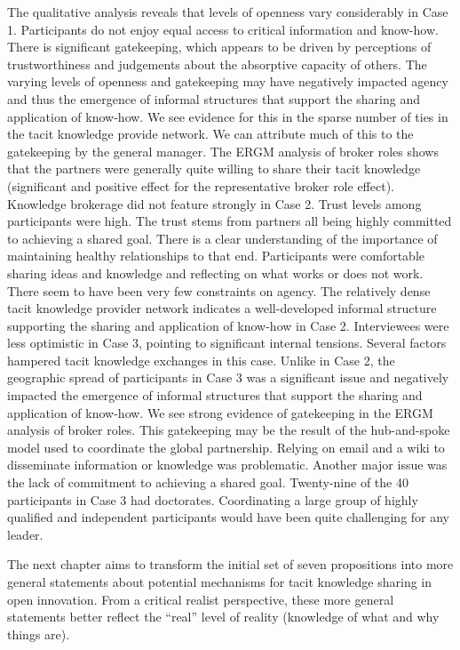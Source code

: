 The qualitative analysis reveals that levels of openness vary considerably in Case 1. Participants do not enjoy equal access to critical information and know-how. There is significant gatekeeping, which appears to be driven by perceptions of trustworthiness and judgements about the absorptive capacity of others. The varying levels of openness and gatekeeping may have negatively impacted agency and thus the emergence of informal structures that support the sharing and application of know-how. We see evidence for this in the sparse number of ties in the tacit knowledge provide network. We can attribute much of this to the gatekeeping by the general manager. The ERGM analysis of broker roles shows that the partners were generally quite willing to share their tacit knowledge (significant and positive effect for the representative broker role effect). Knowledge brokerage did not feature strongly in Case 2. Trust levels among participants were high. The trust stems from partners all being highly committed to achieving a shared goal. There is a clear understanding of the importance of maintaining healthy relationships to that end. Participants were comfortable sharing ideas and knowledge and reflecting on what works or does not work. There seem to have been very few constraints on agency. The relatively dense tacit knowledge provider network indicates a well-developed informal structure supporting the sharing and application of know-how in Case 2. Interviewees were less optimistic in Case 3, pointing to significant internal tensions. Several factors hampered tacit knowledge exchanges in this case. Unlike in Case 2, the geographic spread of participants in Case 3 was a significant issue and negatively impacted the emergence of informal structures that support the sharing and application of know-how. We see strong evidence of gatekeeping in the ERGM analysis of broker roles. This gatekeeping may be the result of the hub-and-spoke model used to coordinate the global partnership. Relying on email and a wiki to disseminate information or knowledge was problematic. Another major issue was the lack of commitment to achieving a shared goal. Twenty-nine of the 40 participants in Case 3 had doctorates. Coordinating a large group of highly qualified and independent participants would have been quite challenging for any leader. \medskip  

The next chapter aims to transform the initial set of seven propositions into more general statements about potential mechanisms for tacit knowledge sharing in open innovation. From a critical realist perspective, these more general statements better reflect the \enquote{real} level of reality (knowledge of what and why things are).

